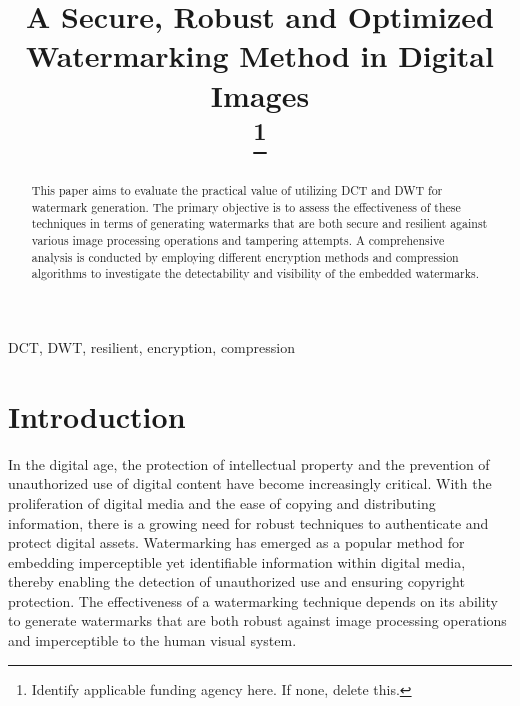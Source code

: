 \documentclass[conference]{IEEEtran}
\begin{document}
\title{A Secure, Robust and Optimized 
Watermarking Method in Digital Images
\\
{}
\thanks{Identify applicable funding agency here. If none, delete this.}
}

\author{
\and
{}
\and
{}
}

\maketitle

\begin{abstract}
This paper aims to evaluate the practical value of utilizing DCT and DWT for watermark generation. The primary objective is to assess the effectiveness of these techniques in terms of generating watermarks that are both secure and resilient against various image processing operations and tampering attempts. A comprehensive analysis is conducted by employing different encryption methods and compression algorithms to investigate the detectability and visibility of the embedded watermarks.
\end{abstract}

\begin{IEEEkeywords}
DCT, DWT, resilient, encryption, compression
\end{IEEEkeywords}

\section{Introduction}
In the digital age, the protection of intellectual property and the prevention of unauthorized use of digital content have become increasingly critical. With the proliferation of digital media and the ease of copying and distributing information, there is a growing need for robust techniques to authenticate and protect digital assets. Watermarking has emerged as a popular method for embedding imperceptible yet identifiable information within digital media, thereby enabling the detection of unauthorized use and ensuring copyright protection. The effectiveness of a watermarking technique depends on its ability to generate watermarks that are both robust against image processing operations and imperceptible to the human visual system. 
\end{document}
